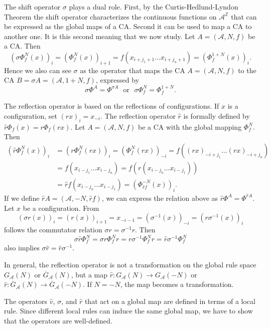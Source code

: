 \documentclass[a4paper]{article}
\begin{document}
The shift operator $\sigma$ plays a dual role.
First, by the Curtis-Hedlund-Lyndon Theorem the shift operator characterizes the continuous functions on $\mathcal{A}^\mathbb{Z}$
that can be expressed as the global maps of a CA.
Second it can be used to map a CA to another one.
It is this second meaning that we now study.
Let $A=(\mathcal{A},N,f)$ be a CA.
Then
\[
(\sigma \Phi^N_f(x))_i = (\Phi^N_f(x))_{i+1}
= f(x_{i+j_1+1} \ldots x_{i+j_{n}+1}) = ( \Phi^{1+N}_f(x))_i.
\]
Hence we also can see $\sigma$ as the operator that maps the CA $A = (\mathcal{A},N,f)$ to
the CA $B = \sigma A = (\mathcal{A}, 1+N,f)$,
expressed by
\[
\sigma \Phi^A = \Phi^{\sigma A} \ \ \ \mbox{or} \ \ \ \sigma \Phi^N_f = \Phi^{1+N}_f.
\]

The reflection operator is based on the reflections of configurations.
If $x$ is a configuration, set $(rx)_i = x_{-i}$.
The reflection operator $\hat{r}$ is formally defined by  $\hat{r} \Phi_f(x) = r \Phi_f(rx)$.
Let $A = (\mathcal{A},N,f)$ be a CA with the global mapping $\Phi^N_f$.
Then
\begin{align*}
(\hat{r} \Phi^N_f(x))_i & =  (r\Phi^N_f(rx))_i
        =  (\Phi^N_f(rx))_{-i} = f((rx)_{-i+j_1} \ldots (rx)_{-i+j_n}) \\
& =  f(x_{i-j_1} \ldots x_{i-j_n}) = f(r(x_{i-j_n} \ldots x_{i-j_1})) \\
& =  \hat{r} f(x_{i-j_n} \ldots x_{i-j_1}) = (\Phi^{-N}_{\hat{r}f}(x))_i.
\end{align*}
If we define $\hat{r}A = (\mathcal{A}, -N, \hat{r}f)$, we can express the relation above as
$\hat{r} \Phi^A = \Phi^{\hat{r} A}$.
Let $x$ be a configuration.
From
\[
(\sigma r (x))_i = (r(x))_{i+1} = x_{-i-1} = (\sigma^{-1}(x))_{-i} = (r \sigma^{-1}(x))_i
\]
follows the commutator relation $\sigma r = \sigma^{-1}r$.
Then
\[
\sigma \hat{r} \Phi^N_f = \sigma r \Phi^N_f r = r \sigma^{-1} \Phi^N_f r = \hat{r} \sigma^{-1} \Phi^N_f
\]
also implies $\sigma \hat{r} = \hat{r} \sigma^{-1}$.


In general, the reflection operator is not a transformation on the global rule space $G_\mathcal{A}(N)$ or
$\overline{G}_\mathcal{A}(N)$,
but a map $\hat{r}: G_\mathcal{A}(N) \to G_\mathcal{A}(-N)$ or $\hat{r}: \overline{G}_\mathcal{A}(N) \to
\overline{G}_\mathcal{A}(-N)$.
If $N = -N$, the map becomes a transformation.

The operators $\hat{v}$, $\sigma$, and $\hat{r}$ that act on a global map are defined in terms of a local rule.
Since different local rules can induce the same global map, we have to show that
the operators are well-defined.
\end{document}
